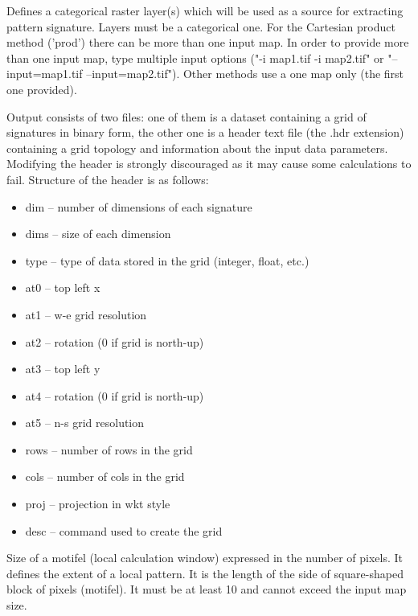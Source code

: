 
Defines a categorical raster layer(s) which will be used as a source for extracting pattern signature.
Layers must be a categorical one. 
For the Cartesian product method ('prod') there can be more than one input map.
In order to provide more than one input map, type multiple input options ("-i map1.tif -i map2.tif" or "--input=map1.tif --input=map2.tif").
Other methods use a one map only (the first one provided). 


Output consists of two files: one of them is a dataset containing a grid of signatures in binary form, the other one is a header text file (the .hdr extension) containing a grid topology and information about the input data parameters.
Modifying the header is strongly discouraged as it may cause some calculations to fail. 
Structure of the header is as follows:\\

\begin{itemize}
	\item dim -- number of dimensions of each signature
	\item dims -- size of each dimension
	\item type -- type of data stored in the grid (integer, float, etc.)
	\item at0 -- top left x
	\item at1 -- w-e grid resolution
	\item at2 -- rotation (0 if grid is north-up)
	\item at3 -- top left y
	\item at4 -- rotation (0 if grid is north-up)
	\item at5 -- n-s grid resolution
	\item rows -- number of rows in the grid
	\item cols -- number of cols in the grid
	\item proj -- projection in wkt style
	\item desc -- command used to create the grid
\end{itemize}


Size of a motifel (local calculation window) expressed in the number of pixels. 
It defines the extent of a local pattern.
It is the length of the side of square-shaped block of pixels (motifel).
It must be at least 10 and cannot exceed the input map size.


